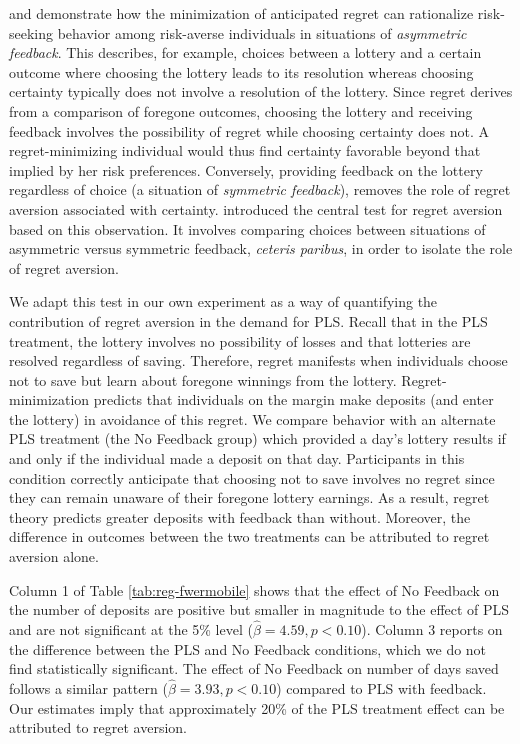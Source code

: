\documentclass[11pt]{article}
\begin{document}
		\textcite{zeelenberg_consequences_1996} and \textcite{zeelenberg_consequences_2004} demonstrate how the minimization of anticipated regret can rationalize risk-seeking behavior among risk-averse individuals in situations of \textit{asymmetric feedback}. This describes, for example, choices between a lottery and a certain outcome where choosing the lottery leads to its resolution whereas choosing certainty typically does not involve a resolution of the lottery. Since regret derives from a comparison of foregone outcomes, choosing the lottery and receiving feedback involves the possibility of regret while choosing certainty does not. A regret-minimizing individual would thus find certainty favorable beyond that implied by her risk preferences. Conversely, providing feedback on the lottery regardless of choice (a situation of \emph{symmetric feedback}), removes the role of regret aversion associated with certainty. \textcite{zeelenberg_consequences_1996} introduced the central test for regret aversion based on this observation. It involves comparing choices between situations of asymmetric versus symmetric feedback, \textit{ceteris paribus}, in order to isolate the role of regret aversion. 


		We adapt this test in our own experiment as a way of quantifying the contribution of regret aversion in the demand for PLS. Recall that in the PLS treatment, the lottery involves no possibility of losses and that lotteries are resolved regardless of saving. Therefore, regret manifests when individuals choose not to save but learn about foregone winnings from the lottery. Regret-minimization predicts that individuals on the margin make deposits (and enter the lottery) in avoidance of this regret. We compare behavior with an alternate PLS treatment (the No Feedback group) which provided a day's lottery results if and only if the individual made a deposit on that day. Participants in this condition correctly anticipate that choosing not to save involves no regret since they can remain unaware of their foregone lottery earnings. As a result, regret theory predicts greater deposits with feedback than without. Moreover, the difference in outcomes between the two treatments can be attributed to regret aversion alone. 

		Column 1 of Table \ref{tab:reg-fwermobile} shows that the effect of No Feedback on the number of deposits are positive but smaller in magnitude to the effect of PLS and are not significant at the 5\% level ($\hat \beta = 4.59, p < 0.10$). Column 3 reports on the difference between the PLS and No Feedback conditions, which we do not find statistically significant. The effect of No Feedback on number of days saved follows a similar pattern ($\hat \beta = 3.93, p < 0.10$) compared to PLS with feedback. Our estimates imply that approximately 20\% of the PLS treatment effect can be attributed to regret aversion.
\end{document}
